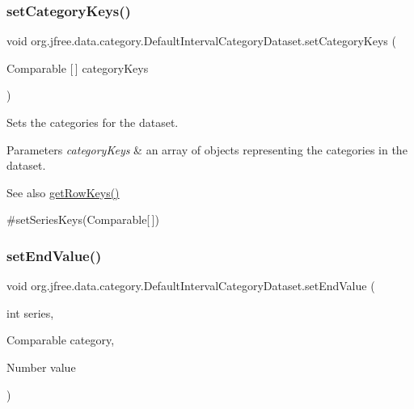 \subsubsection{\texorpdfstring{set\+Category\+Keys()}{setCategoryKeys()}}
{\footnotesize\ttfamily void org.\+jfree.\+data.\+category.\+Default\+Interval\+Category\+Dataset.\+set\+Category\+Keys (\begin{DoxyParamCaption}\item[{Comparable \mbox{[}$\,$\mbox{]}}]{category\+Keys }\end{DoxyParamCaption})}

Sets the categories for the dataset.


\begin{DoxyParams}{Parameters}
{\em category\+Keys} & an array of objects representing the categories in the dataset.\\
\hline
\end{DoxyParams}
\begin{DoxySeeAlso}{See also}
\mbox{\hyperlink{classorg_1_1jfree_1_1data_1_1category_1_1_default_interval_category_dataset_aa8a0a871f4557e0ef292fe5e9db0d55b}{get\+Row\+Keys()}} 

\#set\+Series\+Keys(\+Comparable\mbox{[}$\,$\mbox{]}) 
\end{DoxySeeAlso}
\mbox{\label{classorg_1_1jfree_1_1data_1_1category_1_1_default_interval_category_dataset_a0addba6b157fce6c663310a949b06dc5}} 
\subsubsection{\texorpdfstring{set\+End\+Value()}{setEndValue()}}
{\footnotesize\ttfamily void org.\+jfree.\+data.\+category.\+Default\+Interval\+Category\+Dataset.\+set\+End\+Value (\begin{DoxyParamCaption}\item[{int}]{series,  }\item[{Comparable}]{category,  }\item[{Number}]{value }\end{DoxyParamCaption})}

